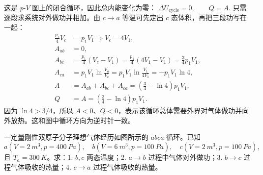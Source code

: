\documentclass[lang=cn,11pt]{elegantbook}
\begin{document}
\begin{solution}
这是 \(p\)-\(V\) 图上的闭合循环，因此总内能变化为零：
 \(\Delta U_{\text{cycle}}=0,\qquad Q=A.\) 
只需逐段求系统对外做功并相加。由 \(c\to a\) 等温可先定出 \(c\) 态体积，再把三段功写在一起：
\[
\begin{aligned}
\frac{p_1}{4}V_c&=p_1V_1
\Longrightarrow V_c=4V_1,\\
A_{ab}&=0,\\
A_{bc}&=\frac{p_1}{4}(V_c-V_1)
=\frac{p_1}{4}(4V_1-V_1)
=\frac34p_1V_1,\\
A_{ca}&=p_1V_1\ln\frac{V_a}{V_c}
=p_1V_1\ln\frac{V_1}{4V_1}
=-p_1V_1\ln4,\\
A&=A_{ab}+A_{bc}+A_{ca}
=\left(\frac34-\ln4\right)p_1V_1,\\
Q&=A=\left(\frac34-\ln4\right)p_1V_1.
\end{aligned}
\]
因为 \(\ln4>3/4\)，所以 \(A<0\)、\(Q<0\)，表示该循环总体需要外界对气体做功并向外放热。这和图中循环方向为逆时针一致。
\end{solution}

\begin{exercise}
一定量刚性双原子分子理想气体经历如图所示的 \(abca\) 循环。已知
 \(a( V=\SI{2}{m^3},p=\SI{400}{Pa}),\quad b( V=\SI{6}{m^3},p=\SI{100}{Pa}),\quad c( V=\SI{2}{m^3},p=\SI{100}{Pa}),\) 
且 \(T_a=\SI{300}{K}\)。求：1. \(b,c\) 两态温度；2. \(a\to b\) 过程中气体对外做功；3. \(b\to c\) 过程气体吸收的热量；4. \(c\to a\) 过程气体吸收的热量。

\begin{center}
\end{center}
\end{exercise}
\end{document}
